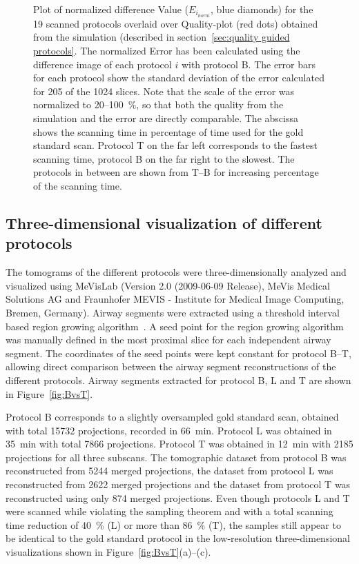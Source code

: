 \begin{figure}
	\centering
	\caption{Plot of normalized difference Value ($E_{i_{norm}}$, blue diamonds) for the 19 scanned protocols overlaid over Quality-plot (red dots) obtained from the simulation (described in section~\ref{sec:quality guided protocols}. The normalized Error has been calculated using the difference image of each protocol $i$ with protocol B. The error bars for each protocol show the standard deviation of the error calculated for 205 of the 1024 slices. Note that the scale of the error was normalized to 20--\SI{100}{\percent}, so that both the quality from the simulation and the error are directly comparable. The abscissa shows the scanning time in percentage of time used for the gold standard scan. Protocol T on the far left corresponds to the fastest scanning time, protocol B on the far right to the slowest. The protocols in between are shown from T--B for increasing percentage of the scanning time.}
	
	\label{fig:NormalizedErrorPlot}
\end{figure}
\cbend

\subsection{Three-dimensional visualization of different protocols}
\label{subsec:comparison}
The tomograms of the different protocols were three-dimensionally analyzed and visualized using MeVisLab (Version 2.0 (2009-06-09 Release), MeVis Medical Solutions AG and Fraunhofer MEVIS - Institute for Medical Image Computing, Bremen, Germany). Airway segments were extracted using a threshold interval based region growing algorithm~\cite{Zucker1976}. A seed point for the region growing algorithm was manually defined in the most proximal slice for each independent airway segment. The coordinates of the seed points were kept constant for protocol B--T, allowing direct comparison between the airway segment reconstructions of the different protocols. Airway segments extracted for protocol B, L and T are shown in Figure~\ref{fig:BvsT}.

Protocol B corresponds to a slightly oversampled gold standard scan, obtained with total 15732 projections, recorded in \SI{66}{\minute}. Protocol L was obtained in \SI{35}{\minute} with total 7866 projections. Protocol T was obtained in \SI{12}{\minute} with 2185 projections for all three subscans. The tomographic dataset from protocol B was reconstructed from 5244 merged projections, the dataset from protocol L was reconstructed from 2622 merged projections and the dataset from protocol T was reconstructed using only 874 merged projections. Even though protocols L and T were scanned while violating the sampling theorem and with a total scanning time reduction of \SI{40}{\percent} (L) or more than \SI{86}{\percent} (T), the samples still appear to be identical to the gold standard protocol in the low-resolution three-dimensional visualizations shown in Figure~\ref{fig:BvsT}(a)--(c).

